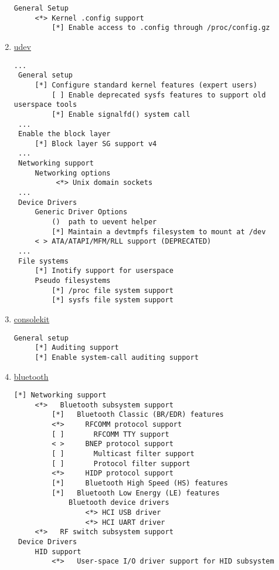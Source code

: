 \documentclass[10pt,a4paper]{article}
\begin{document}
\begin{enumerate}
                        \begin{lstlisting}[style=KernelConfig]
 General Setup
     <*> Kernel .config support
         [*] Enable access to .config through /proc/config.gz
                        \end{lstlisting}

                    \newpage
                    \item \href{https://wiki.gentoo.org/wiki/Udev#Kernel}{udev}

                        \begin{lstlisting}[style=KernelConfig]
 ...
 General setup
     [*] Configure standard kernel features (expert users)
         [ ] Enable deprecated sysfs features to support old userspace tools
         [*] Enable signalfd() system call
 ...
 Enable the block layer
     [*] Block layer SG support v4
 ...
 Networking support
     Networking options
          <*> Unix domain sockets
 ...
 Device Drivers
     Generic Driver Options
         ()  path to uevent helper
         [*] Maintain a devtmpfs filesystem to mount at /dev
     < > ATA/ATAPI/MFM/RLL support (DEPRECATED)
 ...
 File systems
     [*] Inotify support for userspace
     Pseudo filesystems
         [*] /proc file system support
         [*] sysfs file system support
                        \end{lstlisting}

                    \newpage
                    \item \href{https://wiki.gentoo.org/wiki/ConsoleKit#Kernel}{consolekit}
                        \begin{lstlisting}[style=KernelConfig]
 General setup
     [*] Auditing support
     [*] Enable system-call auditing support
                        \end{lstlisting}

                    \newpage
                    \item \href{https://wiki.gentoo.org/wiki/Bluetooth#Kernel}{bluetooth}

                    \begin{lstlisting}[style=KernelConfig]
 [*] Networking support
     <*>   Bluetooth subsystem support
         [*]   Bluetooth Classic (BR/EDR) features
         <*>     RFCOMM protocol support
         [ ]       RFCOMM TTY support
         < >     BNEP protocol support
         [ ]       Multicast filter support
         [ ]       Protocol filter support
         <*>     HIDP protocol support
         [*]     Bluetooth High Speed (HS) features
         [*]   Bluetooth Low Energy (LE) features
             Bluetooth device drivers
                 <*> HCI USB driver
                 <*> HCI UART driver
     <*>   RF switch subsystem support
 Device Drivers
     HID support
         <*>   User-space I/O driver support for HID subsystem
                    \end{lstlisting}


\end{enumerate}
\end{document}
